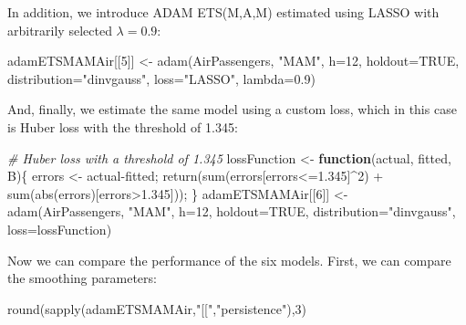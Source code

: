 \documentclass[
]{book}
\newenvironment{Shaded}{\begin{snugshade}}{\end{snugshade}}
\newcommand{\AttributeTok}[1]{\textcolor[rgb]{0.77,0.63,0.00}{#1}}
\newcommand{\CommentTok}[1]{\textcolor[rgb]{0.56,0.35,0.01}{\textit{#1}}}
\newcommand{\ConstantTok}[1]{\textcolor[rgb]{0.00,0.00,0.00}{#1}}
\newcommand{\ControlFlowTok}[1]{\textcolor[rgb]{0.13,0.29,0.53}{\textbf{#1}}}
\newcommand{\DecValTok}[1]{\textcolor[rgb]{0.00,0.00,0.81}{#1}}
\newcommand{\FloatTok}[1]{\textcolor[rgb]{0.00,0.00,0.81}{#1}}
\newcommand{\FunctionTok}[1]{\textcolor[rgb]{0.00,0.00,0.00}{#1}}
\newcommand{\NormalTok}[1]{#1}
\newcommand{\OtherTok}[1]{\textcolor[rgb]{0.56,0.35,0.01}{#1}}
\newcommand{\SpecialCharTok}[1]{\textcolor[rgb]{0.00,0.00,0.00}{#1}}
\newcommand{\StringTok}[1]{\textcolor[rgb]{0.31,0.60,0.02}{#1}}
\theoremstyle{definition}
\theoremstyle{definition}
\theoremstyle{definition}
\theoremstyle{definition}
\theoremstyle{remark}
\begin{document}
In addition, we introduce ADAM ETS(M,A,M) estimated using LASSO with arbitrarily selected \(\lambda=0.9\):

\begin{Shaded}
\begin{Highlighting}[]
\NormalTok{adamETSMAMAir[[}\DecValTok{5}\NormalTok{]] }\OtherTok{\textless{}{-}} \FunctionTok{adam}\NormalTok{(AirPassengers, }\StringTok{"MAM"}\NormalTok{, }\AttributeTok{h=}\DecValTok{12}\NormalTok{, }\AttributeTok{holdout=}\ConstantTok{TRUE}\NormalTok{,}
                           \AttributeTok{distribution=}\StringTok{"dinvgauss"}\NormalTok{,}
                           \AttributeTok{loss=}\StringTok{"LASSO"}\NormalTok{, }\AttributeTok{lambda=}\FloatTok{0.9}\NormalTok{)}
\end{Highlighting}
\end{Shaded}

And, finally, we estimate the same model using a custom loss, which in this case is Huber loss \citep{Huber1992} with the threshold of 1.345:

\begin{Shaded}
\begin{Highlighting}[]
\CommentTok{\# Huber loss with a threshold of 1.345}
\NormalTok{lossFunction }\OtherTok{\textless{}{-}} \ControlFlowTok{function}\NormalTok{(actual, fitted, B)\{}
\NormalTok{    errors }\OtherTok{\textless{}{-}}\NormalTok{ actual}\SpecialCharTok{{-}}\NormalTok{fitted;}
    \FunctionTok{return}\NormalTok{(}\FunctionTok{sum}\NormalTok{(errors[errors}\SpecialCharTok{\textless{}=}\FloatTok{1.345}\NormalTok{]}\SpecialCharTok{\^{}}\DecValTok{2}\NormalTok{) }\SpecialCharTok{+}
               \FunctionTok{sum}\NormalTok{(}\FunctionTok{abs}\NormalTok{(errors)[errors}\SpecialCharTok{\textgreater{}}\FloatTok{1.345}\NormalTok{]));}
\NormalTok{\}}
\NormalTok{adamETSMAMAir[[}\DecValTok{6}\NormalTok{]] }\OtherTok{\textless{}{-}} \FunctionTok{adam}\NormalTok{(AirPassengers, }\StringTok{"MAM"}\NormalTok{, }\AttributeTok{h=}\DecValTok{12}\NormalTok{, }\AttributeTok{holdout=}\ConstantTok{TRUE}\NormalTok{,}
                           \AttributeTok{distribution=}\StringTok{"dinvgauss"}\NormalTok{,}
                           \AttributeTok{loss=}\NormalTok{lossFunction)}
\end{Highlighting}
\end{Shaded}

Now we can compare the performance of the six models. First, we can compare the smoothing parameters:

\begin{Shaded}
\begin{Highlighting}[]
\FunctionTok{round}\NormalTok{(}\FunctionTok{sapply}\NormalTok{(adamETSMAMAir,}\StringTok{"[["}\NormalTok{,}\StringTok{"persistence"}\NormalTok{),}\DecValTok{3}\NormalTok{)}
\end{Highlighting}
\end{Shaded}
\end{document}
